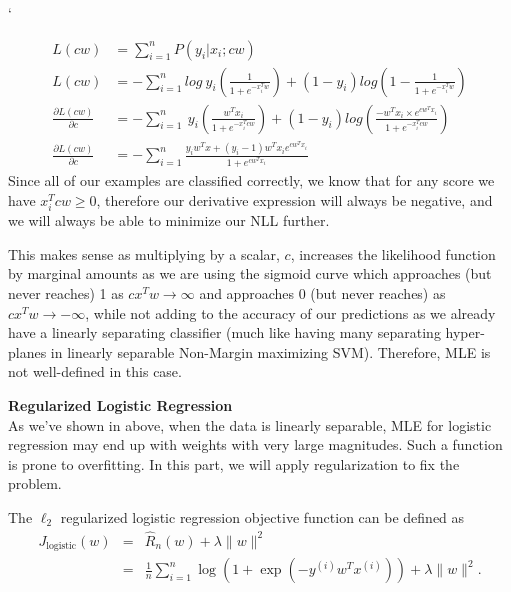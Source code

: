 `\documentclass{article}
\newcommand{\nyuparagraph}[1]{\vspace{0.3cm}\textcolor{nyupurple}{\bf \large #1}\\}
\theoremstyle{plain}
\theoremstyle{definition}
\begin{document}
\begin{enumerate}
\begin{equation}
    \begin{split}
        L(cw) &= \sum_{i=1}^n  P(y_i|x_i;cw) \\ 
        L(cw) &= -\sum_{i=1}^n  log \ y_i\left( \frac{1}{1+e^{-x_i^Tw}} \right) + (1-y_i)log \left(1 -  \frac{1}{1+e^{-x_i^Tw}} \right) \\
        \frac{\partial L(cw)}{\partial c} &= -\sum_{i=1}^n \ y_i\left( \frac{w^Tx_i}{1+e^{-x_i^Tcw}} \right) + (1-y_i)log \left(\frac{-w^Tx_i \times e^{cw^Tx_i}}{1+e^{-x_i^Tcw}} \right) \\
        \frac{\partial L(cw)}{\partial c} &= -\sum_{i=1}^n \frac{y_iw^Tx + (y_i-1)w^Tx_i e^{cw^Tx_i}}{1 + e^{cw^Tx_i}}
    \end{split}
\end{equation}
Since all of our examples are classified correctly, we know that for any score we have $x_i^Tcw \geq 0$, therefore our derivative expression will always be negative, and we will always be able to minimize our NLL further.

This makes sense as multiplying by a scalar, $c$, increases the likelihood function by marginal amounts as we are using the sigmoid curve which approaches (but never reaches) 1 as $cx^Tw \rightarrow \infty$ and approaches 0 (but never reaches) as $cx^Tw \rightarrow -\infty$, while not adding to the accuracy of our predictions as we already have a linearly separating classifier (much like having many separating hyper-planes in linearly separable Non-Margin maximizing SVM). Therefore, MLE is not well-defined in this case.



\setcounter{saveenum}{\value{enumi}}
\end{enumerate}

\nyuparagraph{\label{subsec:Regularized-Logistic-Regression}Regularized Logistic
Regression}
As we've shown in above, when the data is linearly separable,
MLE for logistic regression may end up with weights with very large magnitudes. Such a function is prone to overfitting.
In this part, we will apply regularization to fix the problem.

The $\ell_2$ regularized
logistic regression objective function can be defined as
\begin{eqnarray*}
J_{\text{logistic}}(w) & = & \hat{R}_{n}(w)+\lambda\|w\|^{2}\\
 & = & \frac{1}{n}\sum_{i=1}^{n}\log\left(1+\exp\left(-y^{(i)}w^{T}x^{(i)}\right)\right)+\lambda\|w\|^{2}.
\end{eqnarray*}
 
\end{document}
